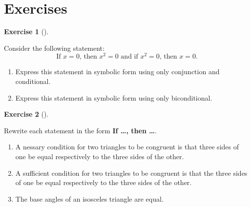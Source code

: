 \documentclass[
  letterpaper,
  10pt,
  reqno,
  twopage,
  openany]{book}
\providecommand{\tightlist}{%
  \setlength{\itemsep}{0pt}\setlength{\parskip}{0pt}}\usepackage{longtable,booktabs,array}
\theoremstyle{plain}
\theoremstyle{definition}
\newtheorem{exercise}{Exercise}[chapter]
\theoremstyle{definition}
\theoremstyle{definition}
\theoremstyle{plain}
\theoremstyle{plain}
\theoremstyle{remark}
\begin{document}
\hypertarget{exercises}{%
\section{Exercises}\label{exercises}}

\leavevmode{}%
\begin{exercise}[]\label{exr-1-1}

Consider the following statement: \[
\text{If $x=0$, then $x^2=0$ and if $x^2=0$, then $x=0$.}
\]

\begin{enumerate}
\def\labelenumi{\arabic{enumi}.}
\tightlist
\item
  Express this statement in symbolic form using only conjunction and
  conditional.
\item
  Express this statement in symbolic form using only biconditional.
\end{enumerate}

\end{exercise}

\leavevmode{}%
\begin{exercise}[]\label{exr-1-2}

Rewrite each statement in the form \textbf{If \ldots, then \ldots{}}.

\begin{enumerate}
\def\labelenumi{\arabic{enumi}.}
\tightlist
\item
  A nessary condition for two triangles to be congruent is that three
  sides of one be equal respectively to the three sides of the other.
\item
  A sufficient condition for two triangles to be congruent is that the
  three sides of one be equal respectively to the three sides of the
  other.
\item
  The base angles of an isosceles triangle are equal.
\end{enumerate}

\end{exercise}
\end{document}
